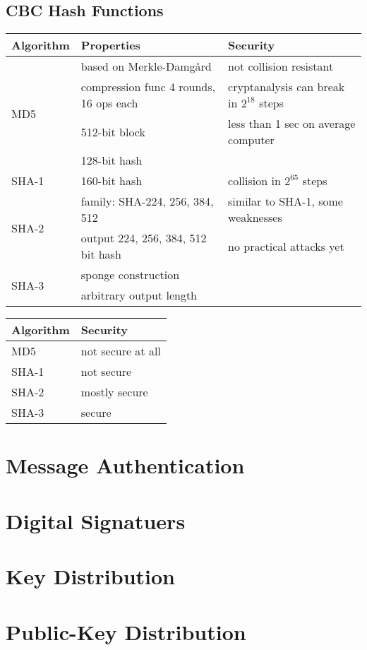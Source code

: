 \documentclass[draft]{article}
\begin{document}
\subsection{CBC Hash Functions}
\begin{tabular}{lll}
    Algorithm              & Properties                             & Security                                  \\\toprule
    \multirow{4}{*}{MD5}   & based on Merkle-Damg\r{a}rd            & not collision resistant                   \\
                           & compression func 4 rounds, 16 ops each & cryptanalysis can break in $2^{18}$ steps \\
                           & 512-bit block                          & less than 1 sec on average computer       \\
                           & 128-bit hash                           &                                           \\\midrule
    SHA-1                  & 160-bit hash                           & collision in $2^{65}$ steps               \\\midrule
    \multirow{2}{*}{SHA-2} & family: SHA-224, 256, 384, 512         & similar to SHA-1, some weaknesses         \\
                           & output 224, 256, 384, 512 bit hash     & no practical attacks yet                  \\\midrule
    \multirow{2}{*}{SHA-3} & sponge construction                    &                                           \\
                           & arbitrary output length                &                                           \\\bottomrule
\end{tabular}

\begin{tabular}{ll}
    Algorithm & Security          \\\toprule
    MD5       & not secure at all \\
    SHA-1     & not secure        \\
    SHA-2     & mostly secure     \\
    SHA-3     & secure            \\\bottomrule
\end{tabular}
\section{Message Authentication}
\section{Digital Signatuers}
\section{Key Distribution}
\section{Public-Key Distribution}
\clearpage

\glsaddall
\printglossary[nonumberlist]
\printglossary[nonumberlist,type=\acronymtype]
\end{document}
